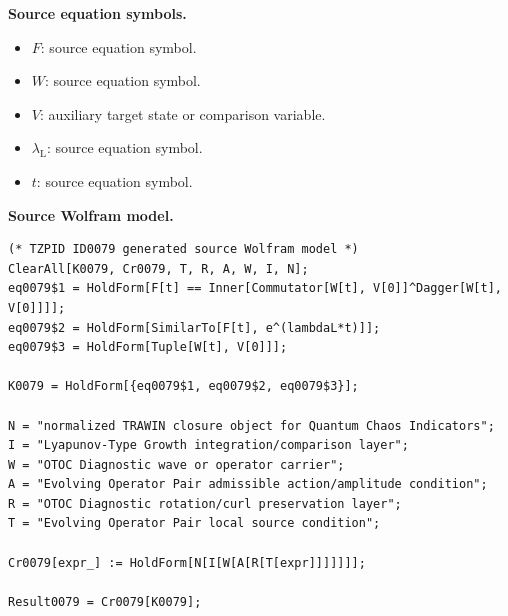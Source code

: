 \begin{minipage}[t]{0.49\linewidth}
\begingroup
\small
\raggedright
\textbf{Source equation symbols.}\par
\begin{itemize}[leftmargin=1.35em,itemsep=1pt,topsep=1pt,parsep=0pt]
    \item $F$: source equation symbol.
    \item $W$: source equation symbol.
    \item $V$: auxiliary target state or comparison variable.
    \item $\lambda_{\mathrm{L}}$: source equation symbol.
    \item $t$: source equation symbol.
\end{itemize}
\endgroup
\end{minipage}\hfill
\begin{minipage}[t]{0.47\linewidth}
\begingroup
\scriptsize
\raggedright
\textbf{Source Wolfram model.}\par
\begin{Verbatim}[fontsize=\tiny,breaklines=true,breakanywhere=true]
(* TZPID ID0079 generated source Wolfram model *)
ClearAll[K0079, Cr0079, T, R, A, W, I, N];
eq0079$1 = HoldForm[F[t] == Inner[Commutator[W[t], V[0]]^Dagger[W[t], V[0]]]];
eq0079$2 = HoldForm[SimilarTo[F[t], e^(lambdaL*t)]];
eq0079$3 = HoldForm[Tuple[W[t], V[0]]];

K0079 = HoldForm[{eq0079$1, eq0079$2, eq0079$3}];

N = "normalized TRAWIN closure object for Quantum Chaos Indicators";
I = "Lyapunov-Type Growth integration/comparison layer";
W = "OTOC Diagnostic wave or operator carrier";
A = "Evolving Operator Pair admissible action/amplitude condition";
R = "OTOC Diagnostic rotation/curl preservation layer";
T = "Evolving Operator Pair local source condition";

Cr0079[expr_] := HoldForm[N[I[W[A[R[T[expr]]]]]]];

Result0079 = Cr0079[K0079];
\end{Verbatim}
\endgroup
\end{minipage}

